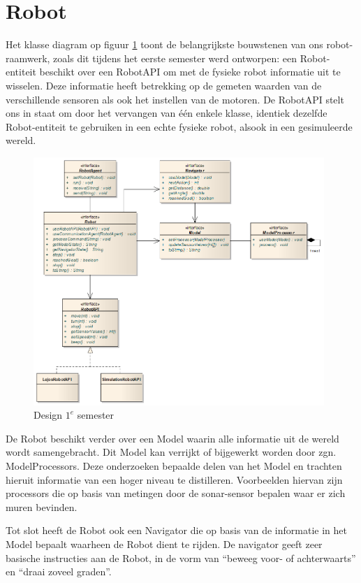 \documentclass[12pt,a4paper]{report}
\begin{document}
\section{Robot}

Het klasse diagram op figuur \ref{uml:design-semester1} toont de belangrijkste bouwstenen van ons robot-raamwerk, zoals dit tijdens het eerste semester werd ontworpen: een Robot-entiteit beschikt over een RobotAPI om met de fysieke robot informatie uit te wisselen. Deze informatie heeft betrekking op de gemeten waarden van de verschillende sensoren als ook het instellen van de motoren. De RobotAPI stelt ons in staat om door het vervangen van \'e\'en enkele klasse, identiek dezelfde Robot-entiteit te gebruiken in een echte fysieke robot, alsook in een gesimuleerde wereld.

\begin{figure}[htbp]
  \centering
  \includegraphics[width=110mm]{resources/design-semester1.png}
  \caption{Design $1^e$ semester}
  \label{uml:design-semester1}
\end{figure}

De Robot beschikt verder over een Model waarin alle informatie uit de wereld wordt samengebracht. Dit Model kan verrijkt of bijgewerkt worden door zgn. ModelProcessors. Deze onderzoeken bepaalde delen van het Model en trachten hieruit informatie van een hoger niveau te distilleren. Voorbeelden hiervan zijn processors die op basis van metingen door de sonar-sensor bepalen waar er zich muren bevinden.

Tot slot heeft de Robot ook een Navigator die op basis van de informatie in het Model bepaalt waarheen de Robot dient te rijden. De navigator geeft zeer basische instructies aan de Robot, in de vorm van ``beweeg voor- of achterwaarts'' en ``draai zoveel graden''.
\end{document}
